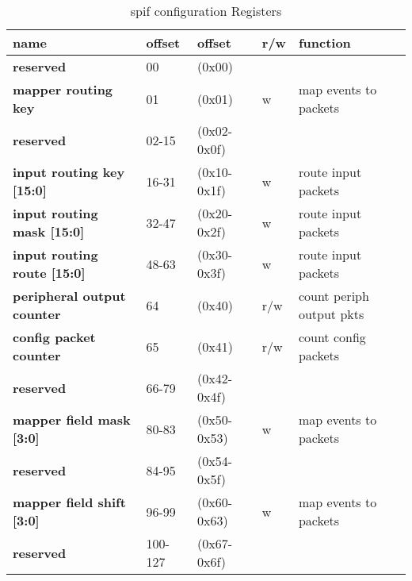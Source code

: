 \documentclass[11pt,a4paper,twoside]{article}
\begin{document}
\begin{table}[!ht]
	\begin{center}
		\renewcommand{\arraystretch}{1.2}
		\begin{tabular}{| l l l l l |}
			\hline
			\textbf{name} & \textbf{offset} & \textbf{offset} & \textbf{r/w} & \textbf{function} \\%
			\hline
			\hline
			\cellcolor{gray!25}\textbf{reserved} & \cellcolor{gray!25}00      & \cellcolor{gray!25}(0x00)      & \cellcolor{gray!25} & \cellcolor{gray!25}\\%
			\textbf{mapper routing key}          & 01                         & (0x01)                         & w                   & map events to packets \\%
			\cellcolor{gray!25}\textbf{reserved} & \cellcolor{gray!25}02-15   & \cellcolor{gray!25}(0x02-0x0f) & \cellcolor{gray!25} & \cellcolor{gray!25}\\%
			\textbf{input routing key [15:0]}    & 16-31                      & (0x10-0x1f)                    & w                   & route input packets \\%
			\textbf{input routing mask [15:0]}   & 32-47                      & (0x20-0x2f)                    & w                   & route input packets \\%
			\textbf{input routing route [15:0]}  & 48-63                      & (0x30-0x3f)                    & w                   & route input packets \\%
			\textbf{peripheral output counter}   & 64                         & (0x40)                         & r/w                 & count periph output pkts\\%
			\textbf{config packet counter}       & 65                         & (0x41)                         & r/w                 & count config packets \\%
			\cellcolor{gray!25}\textbf{reserved} & \cellcolor{gray!25}66-79   & \cellcolor{gray!25}(0x42-0x4f) & \cellcolor{gray!25} & \cellcolor{gray!25}\\%
			\textbf{mapper field mask [3:0]}     & 80-83                      & (0x50-0x53)                    & w                   & map events to packets \\%
			\cellcolor{gray!25}\textbf{reserved} & \cellcolor{gray!25}84-95   & \cellcolor{gray!25}(0x54-0x5f) & \cellcolor{gray!25} & \cellcolor{gray!25}\\%
			\textbf{mapper field shift [3:0]}    & 96-99                      & (0x60-0x63)                    & w                   & map events to packets \\%
			\cellcolor{gray!25}\textbf{reserved} & \cellcolor{gray!25}100-127 & \cellcolor{gray!25}(0x67-0x6f) & \cellcolor{gray!25} & \cellcolor{gray!25}\\%
			\hline
		\end{tabular}
		\caption{spif configuration Registers}
	\end{center}
	\label{tab:spif_regs}
\end{table}
\end{document}
